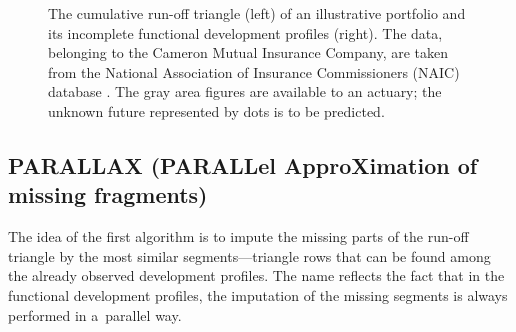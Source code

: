 \begin{figure}[!t]
    \caption{\footnotesize The cumulative run-off triangle (left) of an illustrative portfolio and its incomplete functional development profiles (right). The data, belonging to the Cameron Mutual Insurance Company, are taken from the National Association of Insurance Commissioners (NAIC) database \citep{NAIC2011}. The gray area figures are available to an actuary; the unknown future represented by dots is to be predicted.
    }
    \label{fig1}
\end{figure}

\subsection{PARALLAX {\rm (\textbf{PARALL}el \textbf{A}ppro\textbf{X}imation of missing fragments)}} 
\label{theory_parallax}
The idea of the first algorithm is to impute the missing parts of the run-off triangle by the most similar segments---triangle rows that can be found among the already observed development profiles. The name reflects the fact that in the functional development profiles, the imputation of the missing segments is always performed in a~parallel way.

